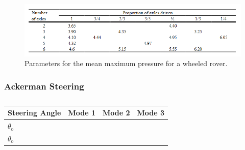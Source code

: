 \begin{figure}[htb] 
  \centering
     \includegraphics[width=1\textwidth]{Media/MMP_Param.png}
  \caption{Parameters for the mean maximum pressure for a wheeled rover.}
  \label{fig:MMP_param}
\end{figure}

\subsubsection*{Ackerman Steering}
\label{app:Ackerman}



\begin{table}[htb]
\centering
\caption{}
\begin{adjustbox}{max width=\textwidth}
\begin{tabular}[l]{lccc}

	\toprule
		\multicolumn{1}{l}{Steering Angle} & \multicolumn{1}{c}{Mode 1} & \multicolumn{1}{c}{Mode 2} & \multicolumn{1}{c}{Mode 3} \\
		
	\midrule
	
	
	\(\theta_\text{o}\)	&	&	&	\\	
	
	\(\theta_\text{o}\) &	&	&	\\


	\bottomrule

\end{tabular}
\end{adjustbox}
\label{tab:Ackerman}
\end{table}


\clearpage

\setcounter{figure}{0}
\setcounter{table}{0}

